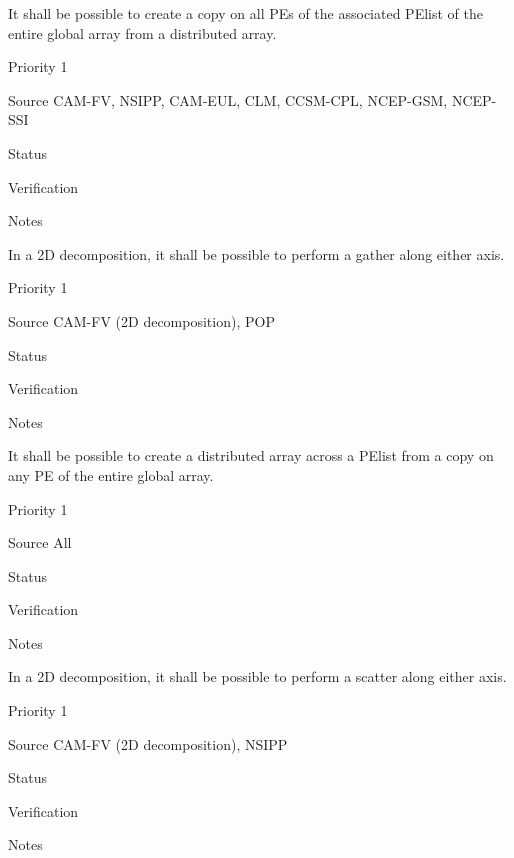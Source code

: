 
It shall be possible to create a copy on all PEs of the associated
PElist of the entire global array from a distributed array.

\begin{reqlist}
\item[Priority] 1
\item[Source] CAM-FV, NSIPP, CAM-EUL, CLM, CCSM-CPL, NCEP-GSM, NCEP-SSI
\item[Status]
\item[Verification]
\item[Notes] 
\end{reqlist}

 \label{DG:PartGather}

In a 2D decomposition, it shall be possible to perform a gather along
either axis.

\begin{reqlist}
\item[Priority] 1
\item[Source] CAM-FV (2D decomposition), POP
\item[Status]
\item[Verification]
\item[Notes] 
\end{reqlist}


It shall be possible to create a distributed array across a PElist
from a copy on any PE of the entire global array.

\begin{reqlist}
\item[Priority] 1
\item[Source] All
\item[Status]
\item[Verification]
\item[Notes] 
\end{reqlist}


In a 2D decomposition, it shall be possible to perform a scatter along
either axis.

\begin{reqlist}
\item[Priority] 1
\item[Source] CAM-FV (2D decomposition), NSIPP
\item[Status]
\item[Verification]
\item[Notes] 
\end{reqlist}

